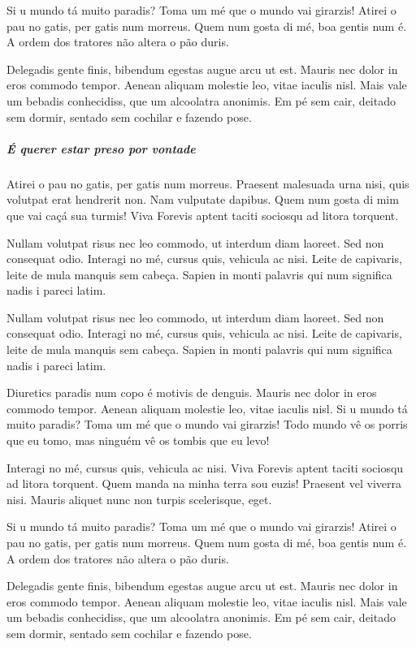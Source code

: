 Si u mundo tá muito paradis? Toma um mé que o mundo vai girarzis! Atirei o pau
no gatis, per gatis num morreus. Quem num gosta di mé, boa gentis num é. A
ordem dos tratores não altera o pão duris.

Delegadis gente finis, bibendum egestas augue arcu ut est. Mauris nec dolor in
eros commodo tempor. Aenean aliquam molestie leo, vitae iaculis nisl. Mais vale
um bebadis conhecidiss, que um alcoolatra anonimis. Em pé sem cair, deitado sem
dormir, sentado sem cochilar e fazendo pose.

\subparagraph{É querer estar preso por vontade}

Atirei o pau no gatis, per gatis num morreus. Praesent malesuada urna nisi,
quis volutpat erat hendrerit non. Nam vulputate dapibus. Quem num gosta di mim
que vai caçá sua turmis! Viva Forevis aptent taciti sociosqu ad litora
torquent.

Nullam volutpat risus nec leo commodo, ut interdum diam laoreet. Sed non
consequat odio. Interagi no mé, cursus quis, vehicula ac nisi. Leite de
capivaris, leite de mula manquis sem cabeça. Sapien in monti palavris qui num
significa nadis i pareci latim.


Nullam volutpat risus nec leo commodo, ut interdum diam laoreet. Sed non
consequat odio. Interagi no mé, cursus quis, vehicula ac nisi. Leite de
capivaris, leite de mula manquis sem cabeça. Sapien in monti palavris qui num
significa nadis i pareci latim.

Diuretics paradis num copo é motivis de denguis. Mauris nec dolor in eros
commodo tempor. Aenean aliquam molestie leo, vitae iaculis nisl. Si u mundo tá
muito paradis? Toma um mé que o mundo vai girarzis! Todo mundo vê os porris que
eu tomo, mas ninguém vê os tombis que eu levo!

Interagi no mé, cursus quis, vehicula ac nisi. Viva Forevis aptent taciti
sociosqu ad litora torquent. Quem manda na minha terra sou euzis! Praesent vel
viverra nisi. Mauris aliquet nunc non turpis scelerisque, eget.

Si u mundo tá muito paradis? Toma um mé que o mundo vai girarzis! Atirei o pau
no gatis, per gatis num morreus. Quem num gosta di mé, boa gentis num é. A
ordem dos tratores não altera o pão duris.

Delegadis gente finis, bibendum egestas augue arcu ut est. Mauris nec dolor in
eros commodo tempor. Aenean aliquam molestie leo, vitae iaculis nisl. Mais vale
um bebadis conhecidiss, que um alcoolatra anonimis. Em pé sem cair, deitado sem
dormir, sentado sem cochilar e fazendo pose.

